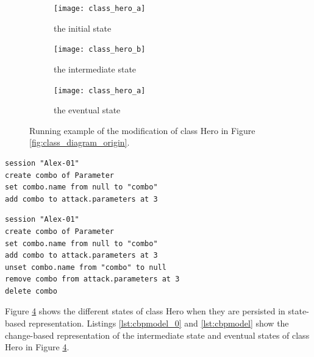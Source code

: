 \begin{figure}[ht]
  \begin{subfigure}[t]{0.32\linewidth}
    \centering
    \texttt{[image: class\_hero\_a]}
    \caption{the initial state}
    \label{fig:initial_model}
  \end{subfigure}
  \hfill
  \begin{subfigure}[t]{0.32\linewidth}
    \centering
    \texttt{[image: class\_hero\_b]}
    \caption{the intermediate state}
    \label{fig:intermediate_model}
  \end{subfigure}
  \hfill
  \begin{subfigure}[t]{0.32\linewidth}
    \centering
    \texttt{[image: class\_hero\_a]}
    \caption{the eventual state}
    \label{fig:modified_model}
  \end{subfigure}
  \caption{Running example of the modification of class \textsf{Hero} in Figure \ref{fig:class_diagram_origin}.}
  \label{fig:tree_example}
\end{figure}


\vspace{-20pt}
\begin{lstlisting}[firstnumber=30,style=eol,caption={Change-based representation of the intermediate state of class \textsf{Hero} in Figure \ref{fig:intermediate_model} after the addition of parameter \textsf{combo}.},label=lst:cbpmodel_0]
session "Alex-01"
create combo of Parameter
set combo.name from null to "combo"
add combo to attack.parameters at 3
\end{lstlisting}

\vspace{-20pt}
\begin{lstlisting}[firstnumber=30,style=eol,caption={Change-based representation of the eventual state of class \textsf{Hero} in Figure \ref{fig:modified_model} after the removal of parameter \textsf{combo}.},label=lst:cbpmodel]
session "Alex-01"
create combo of Parameter
set combo.name from null to "combo"
add combo to attack.parameters at 3
unset combo.name from "combo" to null
remove combo from attack.parameters at 3
delete combo
\end{lstlisting}

Figure \ref{fig:tree_example} shows the different states of class \textsf{Hero} when they are persisted in state-based representation. 
Listings \ref{lst:cbpmodel_0} and \ref{lst:cbpmodel} show the change-based representation of the intermediate state and eventual states of class \textsf{Hero} in Figure \ref{fig:tree_example}. 


